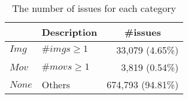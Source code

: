 
\begin{table}[h]
    \begin{center}
    \caption{The number of issues for each category}
    \begin{tabular}{llr}
        \toprule
         & \multicolumn{1}{c}{\textbf{Description}} & \multicolumn{1}{c}{\textbf{\#issues}} \\
        \midrule
        $Img$  & $\#imgs \geq 1$ & 33,079 (4.65\%)\\
        $Mov$  & $\#movs \geq 1$ & 3,819 (0.54\%)\\
        $None$ & Others & 674,793 (94.81\%)\\ 
        \bottomrule
    \end{tabular}
    \label{classify_result}
    \end{center}
\end{table}
